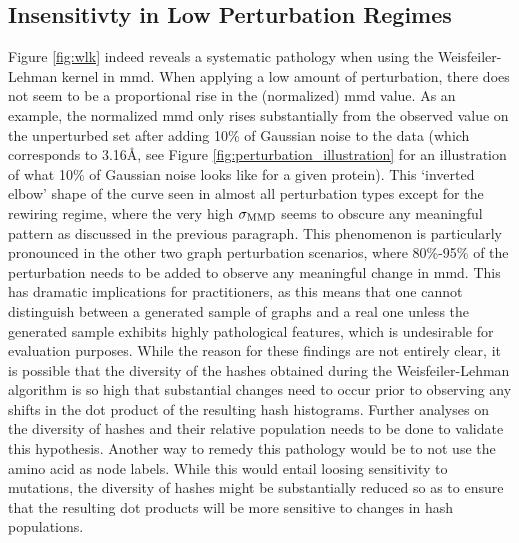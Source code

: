 \subsection{Insensitivty in Low Perturbation Regimes} \label{sec:insensitivity_wl_kernel}
Figure \ref{fig:wlk} indeed reveals a systematic pathology when using the
Weisfeiler-Lehman kernel in \gls{mmd}. When applying a low amount of perturbation,
there does not seem to be a proportional rise in the (normalized) \gls{mmd} value. As
an example, the normalized \gls{mmd} only rises substantially from the observed value
on the unperturbed set after adding 10\% of Gaussian noise to the data (which
corresponds to 3.16\si{\angstrom}, see Figure
\ref{fig:perturbation_illustration} for an illustration of what 10\% of Gaussian
noise looks like for a given protein). This `inverted elbow' shape of the curve
seen in almost all perturbation types except for the rewiring regime, where the
very high $\sigma_{\text{MMD}}$ seems to obscure any meaningful pattern as discussed in
the previous paragraph. This phenomenon is particularly pronounced in the other
two graph perturbation scenarios, where 80\%-95\% of the perturbation needs to
be added to observe any meaningful change in \gls{mmd}. This has dramatic implications
for practitioners, as this means that one cannot distinguish between a generated
sample of graphs and a real one unless the generated sample exhibits highly
pathological features, which is undesirable for evaluation purposes. While the
reason for these findings are not entirely clear, it is possible that the
diversity of the hashes obtained during the Weisfeiler-Lehman algorithm is so
high that substantial changes need to occur prior to observing any shifts in the
dot product of the resulting hash histograms. Further analyses on the diversity
of hashes and their relative population needs to be done to validate this
hypothesis. Another way to remedy this pathology would be to not use the amino
acid as node labels. While this would entail loosing sensitivity to mutations,
the diversity of hashes might be substantially reduced so as to ensure that the
resulting dot products will be more sensitive to changes in hash populations.




